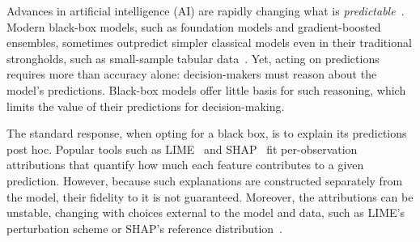 \documentclass[12pt]{article}
\theoremstyle{definition}
\begin{document}
Advances in artificial intelligence (AI) are rapidly changing what is \textit{predictable}~\cite{jumper2021highly, lam2023learning}. 
Modern black-box models, such as foundation models and gradient-boosted ensembles, sometimes outpredict simpler classical models even in their traditional strongholds, such as small-sample tabular data~\cite{hollmann2025accurate, kolberg2025tabpfn, ma2026tabdpt, kong2026tabfm, qu2025tabicl}. 
Yet, acting on predictions requires more than accuracy alone: decision-makers must reason about the model's predictions.
Black-box models offer little basis for such reasoning, which limits the value of their predictions for decision-making. 

The standard response, when opting for a black box, is to explain its predictions post hoc.
Popular tools such as LIME~\cite{ribeiro2016lime} and SHAP~\cite{lundberg2017unified} fit per-observation attributions that quantify how much each feature contributes to a given prediction. 
However, because such explanations are constructed separately from the model, their fidelity to it is not guaranteed. 
Moreover, the attributions can be unstable, changing with choices external to the model and data, such as LIME's perturbation scheme or SHAP's reference distribution~\cite{garreau2020explaining, slack2020fooling, kumar2020problems, aas2021explaining}.
\end{document}
